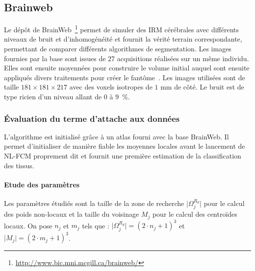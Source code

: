 \subsection{Brainweb}
\label{subsec:brainweb}

Le dépôt de BrainWeb~\footnote{\url{http://www.bic.mni.mcgill.ca/brainweb/}} permet de simuler des IRM cérébrales avec différents niveaux de bruit et d'inhomogénéité et fournit la vérité terrain correspondante, permettant de comparer différents algorithmes de segmentation.
Les images fournies par la base sont issues de 27 acquisitions réalisées sur un même individu.
Elles sont ensuite moyennées pour construire le volume initial auquel sont ensuite appliqués divers traitements pour créer le fantôme~\cite{Collins:TMI:1998}.
Les images utilisées sont de taille $181\times181\times217$ avec des voxels isotropes de $1$ mm de côté.
Le bruit est de type ricien d'un niveau allant de $0$ à $9$~\%.

\subsubsection{Évaluation du terme d'attache aux données}
\label{sec:brainweb:nlData}

L'algorithme est initialisé grâce à un atlas fourni avec la base BrainWeb.
Il permet d'initialiser de manière fiable les moyennes locales avant le lancement de NL-FCM proprement dit et fournit une première estimation de la classification des tissus.

\paragraph*{Etude des paramètres}

Les paramètres étudiés sont la taille de la zone de recherche $\lvert \Omega^{R_{d}}_{j} \rvert$ pour le calcul des poids non-locaux et la taille du voisinage $M_j$ pour le calcul des centroïdes locaux.
On pose $n_j$ et $m_j$ tels que : $\lvert \Omega^{R_{d}}_{j} \rvert = (2 \cdot n_j + 1)^{3}$ et $\lvert M_{j} \rvert = (2 \cdot m_j + 1)^{3}$.

